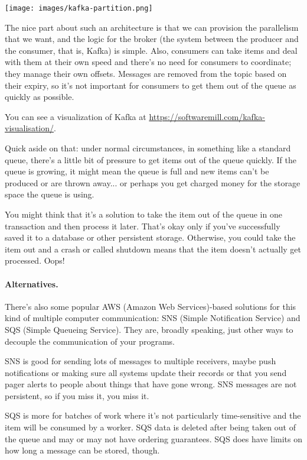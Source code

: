 \documentclass[a4paper]{report}
\begin{document}
\begin{center}
	\texttt{[image: images/kafka-partition.png]}
\end{center}

The nice part about such an architecture is that we can provision the parallelism that we want, and the logic for the broker (the system between the producer and the consumer, that is, Kafka) is simple. Also, consumers can take items and deal with them at their own speed and there's no need for consumers to coordinate; they manage their own offsets. Messages are removed from the topic based on their expiry, so it's not important for consumers to get them out of the queue as quickly as possible.

You can see a visualization of Kafka at \href{https://softwaremill.com/kafka-visualisation/}{https://softwaremill.com/kafka-visualisation/}.

Quick aside on that: under normal circumstances, in something like a standard queue, there's a little bit of pressure to get items out of the queue quickly. If the queue is growing, it might mean the queue is full and new items can't be produced or are thrown away... or perhaps you get charged money for the storage space the queue is using. 

You might think that it's a solution to take the item out of the queue in one transaction and then process it later. That's okay only if you've successfully saved it to a database or other persistent storage. Otherwise, you could take the item out and a crash or called shutdown means that the item doesn't actually get processed. Oops!

\paragraph{Alternatives.} There's also some popular AWS (Amazon Web Services)-based solutions for this kind of multiple computer communication: SNS (Simple Notification Service) and SQS (Simple Queueing Service). They are, broadly speaking, just other ways to decouple the communication of your programs.

SNS is good for sending lots of messages to multiple receivers, maybe push notifications or making sure all systems update their records or that you send pager alerts to people about things that have gone wrong. SNS messages are not persistent, so if you miss it, you miss it. 

SQS is more for batches of work where it's not particularly time-sensitive and the item will be consumed by a worker. SQS data is deleted after being taken out of the queue and may or may not have ordering guarantees. SQS does have limits on how long a message can be stored, though. 
\end{document}
